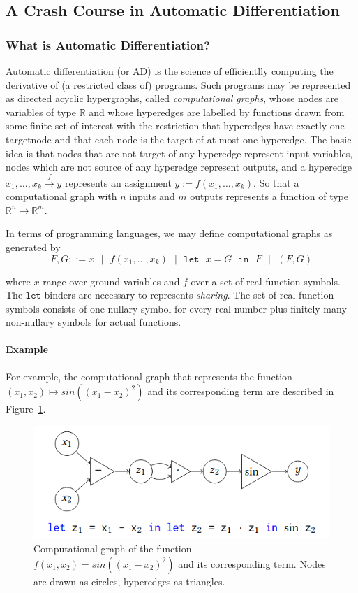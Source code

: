 \subsection{A Crash Course in Automatic Differentiation}

\subsubsection{What is Automatic Differentiation?}
Automatic differentiation (or AD) is the science of efficientlly computing the derivative of (a restricted class of) programs. Such programs may be represented as directed acyclic hypergraphs, called \emph{computational graphs}, whose nodes are variables of type $\mathbb{R}$ and whose hyperedges are labelled by functions drawn from some finite set of interest with the restriction that hyperedges have exactly one targetnode and that each node is the target of at most one hyperedge. The basic idea is that nodes that are not target of any hyperedge represent input variables, nodes which are not source of any hyperedge represent outputs, and a hyperedge $x_1, \dots, x_k \xrightarrow{f} y$ represents an assignment $y:= f(x_1,\dots, x_k)$. So that a computational graph with $n$ inputs and $m$ outputs represents a function of type $\mathbb{R}^n\rightarrow \mathbb{R}^m$. 

In terms of programming languages, we may define computational graphs as generated by
$$ F, G ::= x \mbox{ }|\mbox{ }  f(x_1,...,x_k) \mbox{ }|\mbox{ }  \mathtt{let} \mbox{ } x = G \mbox{ } \mathtt{in} \mbox{ }F \mbox{ }|\mbox{ }  (F,G) $$

where $x$ range over ground variables and $f$ over a set of real function symbols. The $\mathtt{let}$ binders are necessary to represents \emph{sharing}. The set of real function symbols consists of one nullary symbol for every real number plus finitely many non-nullary symbols for actual functions. 

\paragraph{Example} For example, the computational graph that represents the function $(x_1, x_2) \mapsto sin((x_1-x_2)^2)$ and its corresponding term are described in Figure~\ref{compGraph2}.

\begin{figure}[h!]
	\centering
	\includegraphics[scale=0.5]{img/compGraph2}
	\caption{Computational graph of the function $f(x_1,x_2)=sin((x_1-x_2)^2)$ and its corresponding term. Nodes are drawn as circles, 			hyperedges as triangles.}
	\label{compGraph2}
\end{figure}

